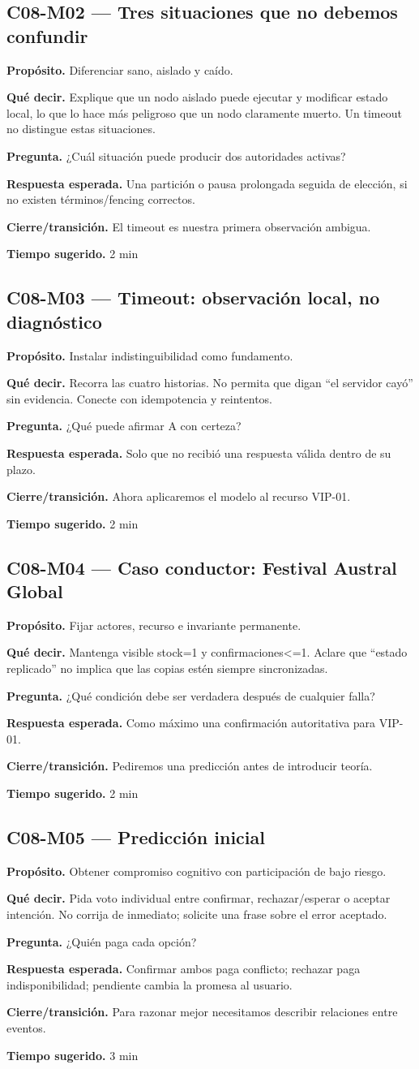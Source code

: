\documentclass[variant=docente,cover=institutional,mode=screen]{ua-engineering-v6-article}
\newcommand{\FrameField}[2]{\par\noindent\textbf{#1.} #2\par}
\begin{document}
\subsection*{C08-M02 --- Tres situaciones que no debemos confundir}
\FrameField{Propósito}{Diferenciar sano, aislado y caído.}
\FrameField{Qué decir}{Explique que un nodo aislado puede ejecutar y modificar estado local, lo que lo hace más peligroso que un nodo claramente muerto. Un timeout no distingue estas situaciones.}
\FrameField{Pregunta}{¿Cuál situación puede producir dos autoridades activas?}
\FrameField{Respuesta esperada}{Una partición o pausa prolongada seguida de elección, si no existen términos/fencing correctos.}
\FrameField{Cierre/transición}{El timeout es nuestra primera observación ambigua.}
\FrameField{Tiempo sugerido}{2 min}

\subsection*{C08-M03 --- Timeout: observación local, no diagnóstico}
\FrameField{Propósito}{Instalar indistinguibilidad como fundamento.}
\FrameField{Qué decir}{Recorra las cuatro historias. No permita que digan “el servidor cayó” sin evidencia. Conecte con idempotencia y reintentos.}
\FrameField{Pregunta}{¿Qué puede afirmar A con certeza?}
\FrameField{Respuesta esperada}{Solo que no recibió una respuesta válida dentro de su plazo.}
\FrameField{Cierre/transición}{Ahora aplicaremos el modelo al recurso VIP-01.}
\FrameField{Tiempo sugerido}{2 min}

\subsection*{C08-M04 --- Caso conductor: Festival Austral Global}
\FrameField{Propósito}{Fijar actores, recurso e invariante permanente.}
\FrameField{Qué decir}{Mantenga visible stock=1 y confirmaciones<=1. Aclare que “estado replicado” no implica que las copias estén siempre sincronizadas.}
\FrameField{Pregunta}{¿Qué condición debe ser verdadera después de cualquier falla?}
\FrameField{Respuesta esperada}{Como máximo una confirmación autoritativa para VIP-01.}
\FrameField{Cierre/transición}{Pediremos una predicción antes de introducir teoría.}
\FrameField{Tiempo sugerido}{2 min}

\subsection*{C08-M05 --- Predicción inicial}
\FrameField{Propósito}{Obtener compromiso cognitivo con participación de bajo riesgo.}
\FrameField{Qué decir}{Pida voto individual entre confirmar, rechazar/esperar o aceptar intención. No corrija de inmediato; solicite una frase sobre el error aceptado.}
\FrameField{Pregunta}{¿Quién paga cada opción?}
\FrameField{Respuesta esperada}{Confirmar ambos paga conflicto; rechazar paga indisponibilidad; pendiente cambia la promesa al usuario.}
\FrameField{Cierre/transición}{Para razonar mejor necesitamos describir relaciones entre eventos.}
\FrameField{Tiempo sugerido}{3 min}
\end{document}
